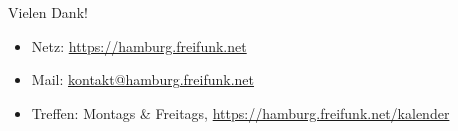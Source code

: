 \documentclass[t]{beamer}
\begin{document}
  \begin{frame}{Vielen Dank!}
    \begin{center}
      
    \end{center}
    \begin{itemize}
      \item Netz: \href{https://hamburg.freifunk.net}{https://hamburg.freifunk.net}
      \item Mail: \href{mailto:kontakt@hamburg.freifunk.net}{kontakt@hamburg.freifunk.net}
      \item Treffen: Montags \& Freitags, \href{https://hamburg.freifunk.net/kalender}{https://hamburg.freifunk.net/kalender}
    \end{itemize}
  \end{frame}
  
\end{document}
